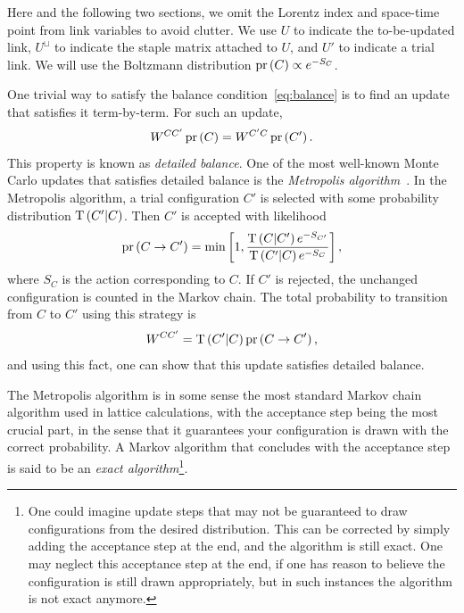 Here and the following two sections,
we omit the Lorentz index and space-time point from link variables to
avoid clutter.  We use $U$ to indicate the to-be-updated link, 
$U^\sqcup$ to indicate the staple matrix attached to $U$, and
$U'$ to indicate a trial link. We will use the Boltzmann
distribution $\operatorname{pr}\left(C\right)\propto e^{-S_C}$.

One trivial way to satisfy the balance condition~\eqref{eq:balance} is
to find an update that satisfies it term-by-term. For such an update, 
\begin{equation}\label{eq:detailedbalance}\index{detailed balance}
    W^{CC'}\pr{C}=W^{C'C}\pr{C'}.
\end{equation}
This property is known as {\it detailed balance}.
One of the most well-known Monte Carlo updates that satisfies detailed
balance is the {\it Metropolis algorithm}~\cite{metropolis_equation_1953}. 
In the Metropolis algorithm, a trial configuration $C'$ is selected 
with some probability distribution $\operatorname{T}\left(C'|C\right)$. Then $C'$
is accepted with likelihood
\begin{equation}\label{eq:metupdate}
  \operatorname{pr}\left(C\to C'\right)=\min\left[1,\frac{\operatorname{T}\left(C|C'\right)e^{-S_{C'}}}
    {\operatorname{T}\left(C'|C\right)e^{-S_C}}\right],
\end{equation}
where $S_C$ is the action corresponding to $C$. 
If $C'$ is rejected, the unchanged configuration is counted
in the Markov chain. The total probability
to transition from $C$ to $C'$ using this strategy is 
\begin{equation}\label{eq:MCMCtransition}
W^{CC'}=\operatorname{T}\left(C'|C\right)\operatorname{pr}\left(C\to C'\right), 
\end{equation}
and using this fact, one
can show that this update satisfies detailed balance.

The Metropolis algorithm is in some sense the most standard Markov chain
algorithm used in lattice calculations, with the acceptance step
 being the most crucial part, in the sense that
it guarantees your configuration is drawn with the correct probability.
A Markov algorithm that concludes with the acceptance step is
said to be an {\it exact algorithm}\footnote{One
could imagine update steps that may not be guaranteed to draw configurations
from the desired distribution. This can be corrected by simply adding
the acceptance step at the end, and the algorithm is still exact.
One may neglect this acceptance step at the end, if one has reason to
believe the configuration is still drawn appropriately, but in such
instances the algorithm is not exact anymore.}.

